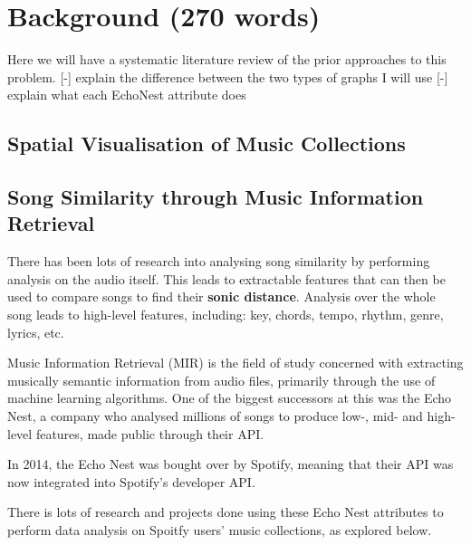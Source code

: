 \chapter{Background (270 words)}
Here we will have a systematic literature review of the prior approaches to this problem.
[-] explain the difference between the two types of graphs I will use
[-] explain what each EchoNest attribute does

\section{Spatial Visualisation of Music Collections}



\section{Song Similarity through Music Information Retrieval}
There has been lots of research into analysing song similarity by performing analysis on the audio itself. This leads to extractable features that can then be used to compare songs to find their \textbf{sonic distance}.
Analysis over the whole song leads to high-level features, including: key, chords, tempo, rhythm, genre, lyrics, etc.

Music Information Retrieval (MIR) is the field of study concerned with extracting musically semantic information from audio files, primarily through the use of machine learning algorithms. One of the biggest successors at this was the Echo Nest, a company who analysed millions of songs to produce low-, mid- and high-level features, made public through their API.

In 2014, the Echo Nest was bought over by Spotify, meaning that their API was now integrated into Spotify's developer API.

There is lots of research and projects done using these Echo Nest attributes to perform data analysis on Spoitfy users' music collections, as explored below.

